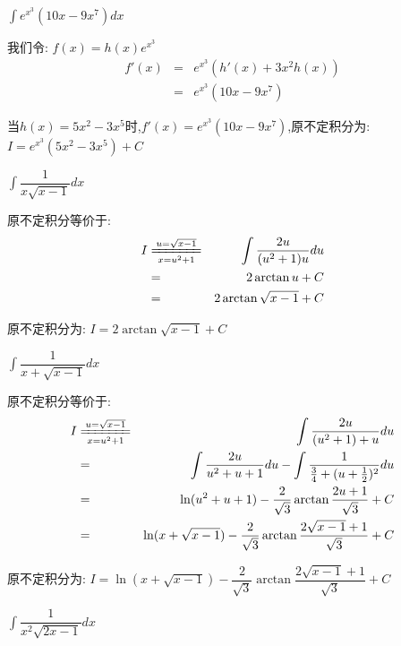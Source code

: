 \begin{proposition}
	$\int e^{x^3}(10x-9x^7)dx$
\end{proposition}
\begin{solution}
		
	我们令:  $f(x)=h(x)e^{x^3}$
	\begin{eqnarray*}
		f'(x)&=&e^{x^3}\left(h'(x)+3x^2h(x)\right) \\
		&=&e^{x^3}(10x-9x^7)
	\end{eqnarray*}
	
	当$h(x)=5x^2-3x^5$时,$f'(x)=e^{x^3}(10x-9x^7)$,原不定积分为:  $I=e^{x^3}(5x^2-3x^5)+C$
\end{solution}
\begin{proposition}
	$\int \dfrac{1}{x\sqrt{x-1}}dx$
\end{proposition}
\begin{solution}
		
	原不定积分等价于:  
	\begin{eqnarray*}
		I&\xlongequal[x=u^2+1]{u=\sqrt{x-1}}&\int \dfrac{2u}{(u^2+1)u}du\\
		&=&2\arctan u+C\\
		&=&2\arctan \sqrt{x-1}+C
	\end{eqnarray*}

原不定积分为:  $I=2\arctan \sqrt{x-1}+C$
\end{solution}
\begin{proposition}
	$\int \dfrac{1}{x+\sqrt{x-1}}dx$
\end{proposition}
\begin{solution}
		
	原不定积分等价于:  
	\begin{eqnarray*}
		I&\xlongequal[x=u^2+1]{u=\sqrt{x-1}}&\int \dfrac{2u}{(u^2+1)+u}du\\
		&=&\int \dfrac{2u}{u^2+u+1}du-\int \dfrac{1}{\frac{3}{4}+(u+\frac{1}{2})^2}du\\
		&=&\ln(u^2+u+1)-\frac{2}{\sqrt{3}}\arctan\dfrac{2u+1}{\sqrt{3}}+C\\
		&=&\ln(x+\sqrt{x-1})-\dfrac{2}{\sqrt{3}}\arctan\dfrac{2\sqrt{x-1}+1}{\sqrt{3}}+C
	\end{eqnarray*}
	
	原不定积分为:  $I=\ln(x+\sqrt{x-1})-\dfrac{2}{\sqrt{3}}\arctan\dfrac{2\sqrt{x-1}+1}{\sqrt{3}}+C$
\end{solution}
\begin{proposition}
	$\int \dfrac{1}{x^2\sqrt{2x-1}}dx$
\end{proposition}
